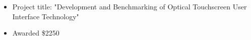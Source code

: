 \small
\begin{itemize}
    \item Project title: "Development and Benchmarking of Optical Touchscreen User Interface Technology"
    \item Awarded \$2250
\end{itemize}
\normalsize
